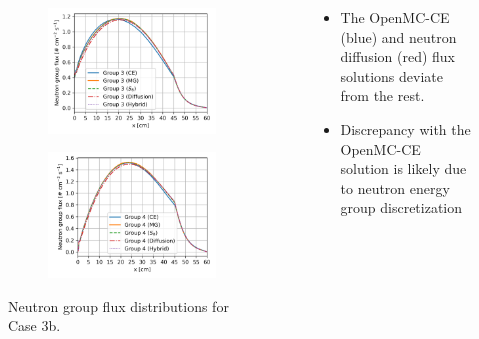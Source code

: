 \begin{frame}
\begin{columns}
\begin{figure}
\begin{subfigure}[t]{.45\textwidth}
      \end{subfigure}
      \begin{subfigure}[t]{.45\textwidth}
        \centering
        \includegraphics[width=\textwidth]{../images/case-3b-group-3-flux}
        \label{fig:c3bg3}
      \end{subfigure}
      \begin{subfigure}[t]{.45\textwidth}
        \centering
        \includegraphics[width=\textwidth]{../images/case-3b-group-4-flux}
        \label{fig:c3bg4}
      \end{subfigure}
      \caption{Neutron group flux distributions for Case 3b.}
      \label{fig:c3bflux}
    \end{figure}
    \column{4cm}
    \begin{itemize}
      \item The OpenMC-CE (blue) and neutron diffusion (red) flux solutions deviate from the rest.
      \item Discrepancy with the OpenMC-CE solution is likely due to neutron energy group
        discretization
    \end{itemize}
  \end{columns}
\end{frame}

